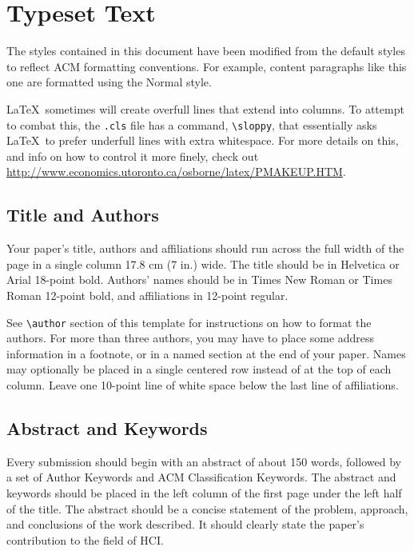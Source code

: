 \documentclass{sigchi}
\begin{document}
\section{Typeset Text}
The styles contained in this document have been modified from the
default styles to reflect ACM formatting conventions. For example,
content paragraphs like this one are formatted using the Normal style.

\LaTeX\ sometimes will create overfull lines that extend into columns.
To attempt to combat this, the \texttt{.cls} file has a command,
\texttt{{\textbackslash}sloppy}, that essentially asks \LaTeX\ to
prefer underfull lines with extra whitespace.  For more details on
this, and info on how to control it more finely, check out
{\url{http://www.economics.utoronto.ca/osborne/latex/PMAKEUP.HTM}}.

\subsection{Title and Authors}

Your paper's title, authors and affiliations should run across the
full width of the page in a single column 17.8 cm (7 in.) wide.  The
title should be in Helvetica or Arial 18-point bold.  Authors' names
should be in Times New Roman or Times Roman 12-point bold, and
affiliations in 12-point regular.  

See \texttt{{\textbackslash}author} section of this template for
instructions on how to format the authors. For more than three
authors, you may have to place some address information in a footnote,
or in a named section at the end of your paper. Names may optionally
be placed in a single centered row instead of at the top of each
column. Leave one 10-point line of white space below the last line of
affiliations.

\subsection{Abstract and Keywords}

Every submission should begin with an abstract of about 150 words,
followed by a set of Author Keywords and ACM Classification
Keywords. The abstract and keywords should be placed in the left
column of the first page under the left half of the title. The
abstract should be a concise statement of the problem, approach, and
conclusions of the work described. It should clearly state the paper's
contribution to the field of HCI\@.
\end{document}
